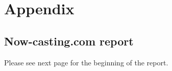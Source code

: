 \chapter[]{Appendix}
\label{Appendix}


\section{Now-casting.com report}
\label{appendix1}

Please see next page for the beginning of the report.

\pagebreak
















